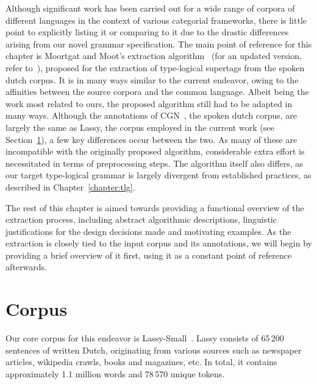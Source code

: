 Although significant work has been carried out for a wide range of corpora of different languages in the context of various categorial frameworks, there is little point to explicitly listing it or comparing to it due to the drastic differences arising from our novel grammar specification.
The main point of reference for this chapter is Moortgat and Moot's extraction algorithm~\cite{moortgat2002using} (for an updated version, refer to~\cite{moot2010extraction}), proposed for the extraction of type-logical supertags from the spoken dutch corpus.
It is in many ways similar to the current endeavor, owing to the affinities between the source corpora and the common language.
Albeit being the work most related to ours, the proposed algorithm still had to be adapted in many ways.
Although the annotations of CGN~\cite{hoekstra2001syntactic}, the spoken dutch corpus, are largely the same as Lassy, the corpus employed in the current work (see Section~\ref{section:corpus}), a few key differences occur between the two.
As many of these are incompatible with the originally proposed algorithm, considerable extra effort is necessitated in terms of preprocessing steps.
The algorithm itself also differs, as our target type-logical grammar is largely divergent from established practices, as described in Chapter~\ref{chapter:tlg}.

The rest of this chapter is aimed towards providing a functional overview of the extraction process, including abstract algorithmic descriptions, linguistic justifications for the design decisions made and motivating examples.
As the extraction is closely tied to the input corpus and its annotations, we will begin by providing a brief overview of it first, using it as a constant point of reference afterwards.

\section{Corpus}
\label{section:corpus}
Our core corpus for this endeavor is Lassy-Small~\cite{Lassy}.
Lassy consists of 65\,200 sentences of written Dutch, originating from various sources such as newspaper articles, wikipedia crawls, books and magazines, etc.
In total, it contains approximately 1.1 million words and 78\,570 unique tokens.

